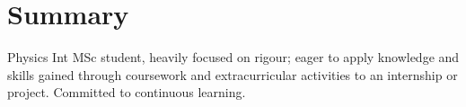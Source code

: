 
\section{Summary}
Physics Int MSc student, heavily focused on rigour; eager to apply knowledge and skills gained through coursework and extracurricular activities to an internship or project. Committed to continuous learning.
